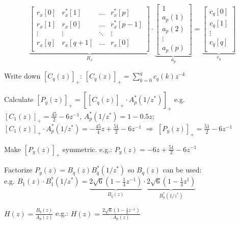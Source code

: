 \begin{aufzaehlung}
			\small$$
\underbrace{\begin{bmatrix}
			r_x[0] & r_x^*[1] & \hdots & r_x^*[p] \\
			r_x[1] & r_x[0] & \hdots & r_x^*[p-1] \\
			\vdots & \vdots & \ddots & \vdots \\
			r_x[q] & r_x[q+1] & \hdots & r_x[0] \\
		\end{bmatrix}  }_{R_x} \cdot \underbrace{\begin{bmatrix}
			1 \\
			a_p(1) \\
			a_p(2) \\
			\vdots \\
			a_p(p)
		\end{bmatrix}  }_{a_p}= \underbrace{\begin{bmatrix}
				c_q[0]\\
				c_q[1]\\
			\vdots \\
				c_q[q]\\
		\end{bmatrix}}_{c_{q}}
			$$ \normalsize
			\item Write down $[C_q(z)]_+$: $[C_q(z)]_+ = \sum\limits_{k=0}^q c_q(k)z^{-k}$
			\item Calculate $[P_y(z)]_+=\left[[C_q(z)]_+ \cdot A^*_p(1/z^*)\right]_+$ e.g. $[C_1(z)]_+=\frac{45}{2}-6z^{-1}$, $A^*_p(1/z^*)=1-0.5z$; $[C_1(z)]_+ \cdot A^*_p(1/z^*)= -\frac{45}{4}z +\frac{51}{2}-6z^{-1}$ $\Rightarrow$  $[P_y(z)]_+= \frac{51}{2}-6z^{-1}$
			\item Make $[P_y(z)]_+$ symmetric. e.g.: $P_y(z) =  -6 z +\frac{51}{2}-6z^{-1}$
			\item Factorize $P_y(z)=B_q(z)B_q^*(1/z^*)$ so $B_q(z)$ can be used: \\
			e.g. $B_1(z)\cdot B_1^*(1/z^*)= \underbrace{2\sqrt{6}(1-\frac{1}{4}z^{-1})}_{B_q(z)}\cdot \underbrace{2\sqrt{6}(1-\frac{1}{4}z^{1})}_{B_q^*(1/z^*)}$
			\item $H(z)=\frac{B_q(z)}{A_p(z)}$ e.g.: $H(z)=\frac{2 \sqrt{6}(1-\frac 1 4 z^{-1})}{A_p(z)}$
\end{aufzaehlung}


